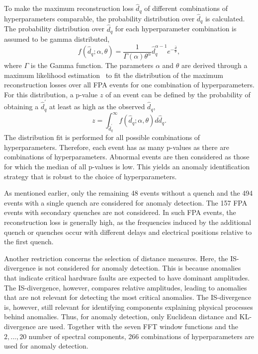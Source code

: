 \documentclass[lettersize,journal]{IEEEtran}
\begin{document}
To make the maximum reconstruction loss $\hat{d}_q$ of different combinations of hyperparameters comparable, the probability distribution over $\hat{d}_q$ is calculated.
The probability distribution over $\hat{d}_q$ for each hyperparameter combination is assumed to be gamma distributed,
\begin{equation}
f(\hat{d}_q; \alpha, \theta) = \frac{1}{\Gamma(\alpha) \theta^{\alpha}} \hat{d}_q^{\alpha - 1} e^{-\frac{\hat{d}}{\theta}},
\end{equation}
where $\Gamma$ is the Gamma function. 
The parameters $\alpha$ and $\theta$ are derived through a maximum likelihood estimation~\cite{rossi2018mathematical} to fit the distribution of the maximum reconstruction losses over all FPA events for one combination of hyperparameters.
For this distribution, a p-value $z$ of an event can be defined by the probability of obtaining a $\hat{d}_q^{'}$ at least as high as the observed $\hat{d}_q$,
\begin{equation}
    z = \int_{\hat{d}_q^{'}}^{\infty}f(\hat{d}_q; \alpha, \theta)d\hat{d}_q.
\end{equation}
The distribution fit is performed for all possible combinations of hyperparameters. Therefore, each event has as many p-values as there are combinations of hyperparameters.
Abnormal events are then considered as those for which the median of all p-values is low. 
This yields an anomaly identification strategy that is robust to the choice of hyperparameters.

As mentioned earlier, only the remaining 48 events without a quench and the 494 events with a single quench are considered for anomaly detection.
The 157 FPA events with secondary quenches are not considered. 
In such FPA events, the reconstruction loss is generally high, as the frequencies induced by the additional quench or quenches occur with different delays and electrical positions relative to the first quench.

Another restriction concerns the selection of distance measures.
Here, the IS-divergence is not considered for anomaly detection.
This is because anomalies that indicate critical hardware faults are expected to have dominant amplitudes.
The IS-divergence, however, compares relative amplitudes, leading to anomalies that are not relevant for detecting the most critical anomalies. 
The IS-divergence is, however, still relevant for identifying components explaining physical processes behind anomalies. 
Thus, for anomaly detection, only Euclidean distance and KL-divergence are used.
Together with the seven FFT window functions and the $2, ..., 20$ number of spectral components, 266 combinations of hyperparameters are used for anomaly detection.
\end{document}
